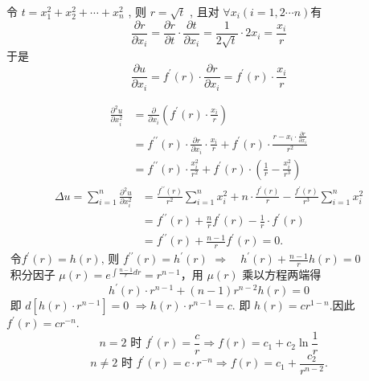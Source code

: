 \begin{questions}
\begin{solution}
 令  $t=x_{1}^{2}+x_{2}^{2}+\cdots+x_{n}^{2}$ , 则 $ r=\sqrt{t}$ , 且对 $ \forall x_{i}(i=1,2 \cdots n)$有
 $$\frac{\partial r}{\partial x_{i}}=\frac{\partial r}{\partial t} \cdot \frac{\partial t}{\partial x_{i}}=\frac{1}{2 \sqrt{t}} \cdot 2 x_{i}=\frac{x_{i}}{r}$$
 于是$$  \frac{\partial u}{\partial x_{i}}=f^{\prime}(r) \cdot \frac{\partial r}{\partial x_{i}}=f^{\prime}(r) \cdot \frac{x_{i}}{r}$$

$$\begin{aligned}
\frac{\partial^{2} u}{\partial x_{i}^{2}}&=\frac{\partial}{\partial x_{i}}\left(f^{\prime}(r) \cdot \frac{x_{i}}{r}\right) \\
&=f^{\prime \prime}(r) \cdot \frac{\partial r}{\partial x_{i}} \cdot \frac{x_{i}}{r}+f^{\prime}(r) \cdot \frac{r-x_{i} \cdot \frac{\partial r}{\partial x_{i}}}{r^2} \\
&=f^{\prime \prime}(r) \cdot \frac{x_{i}^{2}}{r^{2}}+f^{\prime}(r) \cdot\left(\frac{1}{r}-\frac{x_{i}^{2}}{r^{3}}\right)
\end{aligned}
$$
$$
\begin{aligned}
\Delta u=\sum_{i=1}^{n} \frac{\partial^{2} u}{\partial x_{i}^{2}}&=\frac{f^{\prime \prime}(r)}{r^{2}} \sum_{i=1}^{n} x_{i}^{2}+n \cdot \frac{f^{\prime}(r)}{r}-\frac{f^{\prime}(r)}{r^{3}} \sum_{i=1}^{n} x_{i}^{2} \\
&=f^{\prime \prime}(r)+\frac{n}{r} f^{\prime}(r)-\frac{1}{r} \cdot f^{\prime}(r) \\
&=f^{\prime \prime}(r)+\frac{n-1}{r} f^{\prime}(r)=0 \text {. } 
\end{aligned}
$$
$\text { 令} f^{\prime}(r)=h(r) \text {, 则 } f^{\prime \prime}(r)=h^{\prime}(r) $
$\Rightarrow \quad h^{\prime}(r)+\frac{n-1}{r} h(r)=0 $\\
$\text { 积分因子 } \mu(r)=e^{\int \frac{n-1}{r} d r}=r^{n-1} $，用 $ \mu(r) $ 乘以方程两端得
$$h^{\prime}(r) \cdot r^{n-1}+(n-1) r^{n-2} h(r)=0 $$
$\text { 即 } d\left[h(r) \cdot r^{n-1}\right]=0$ $\Rightarrow h(r) \cdot r^{n-1}=c$. 即  $h(r)=c r^{1-n}$.因此$f^{\prime}(r)=c r^{-n}$.
$$
n=2 \text { 时 } f^{\prime}(r)=\frac{c}{r} \Rightarrow f(r)=c_{1}+c_{2} \ln \frac{1}{r} 
$$
$$
n \neq 2 \text { 时 } f^{\prime}(r)=c \cdot r^{-n} \Rightarrow f(r)=c_{1}+\frac{c_{2}}{r^{n-2}} .
$$
\end{solution}




\end{questions}
